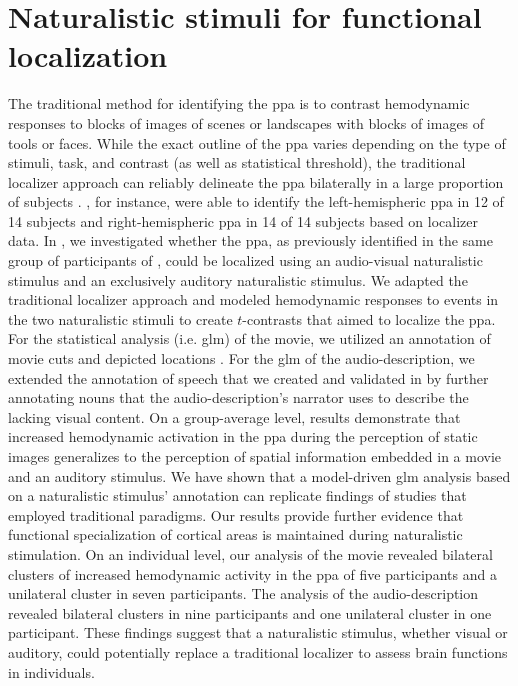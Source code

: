 \pagebreak


\section{Naturalistic stimuli for functional localization}

%
The traditional method for identifying the \ac{ppa} is to contrast hemodynamic
responses to blocks of images of scenes or landscapes with blocks of images of
tools or faces.
%
While the exact outline of the \ac{ppa} varies depending on the type of stimuli,
task, and contrast (as well as statistical threshold), the traditional localizer
approach can reliably delineate the \ac{ppa} bilaterally in a large proportion
of subjects \citep{zhen2017quantifying}.
%
\citet{sengupta2016extension}, for instance, were able to identify the
left-hemispheric \ac{ppa} in 12 of 14 subjects and right-hemispheric \ac{ppa} in
14 of 14 subjects based on localizer data.
In \citet{haeusler2022processing}, we investigated whether the \ac{ppa}, as
previously identified in the same group of participants of
\citet{sengupta2016extension}, could be localized using an audio-visual
naturalistic stimulus and an exclusively auditory naturalistic stimulus.
We adapted the traditional localizer approach and modeled hemodynamic responses
to events in the two naturalistic stimuli to create $t$-contrasts that aimed to
localize the \ac{ppa}.
For the statistical analysis (i.e. \ac{glm}) of the movie, we utilized an
annotation of movie cuts and depicted locations \citep{haeusler2016cutanno}.
For the \ac{glm} of the audio-description, we extended the annotation of speech
that we created and validated in \citet{haeusler2021speechanno} by further
annotating nouns that the audio-description's narrator uses to describe the
lacking visual content.
On a group-average level, results demonstrate that increased hemodynamic
activation in the \ac{ppa} during the perception of static images generalizes to
the perception of spatial information embedded in a movie and an auditory
stimulus.
%
We have shown that a model-driven \ac{glm} analysis based on a naturalistic
stimulus' annotation can replicate findings of studies that employed traditional
paradigms.
%
Our results provide further evidence \citep[cf.][]{bartels2004mapping} that
functional specialization of cortical areas is maintained during naturalistic
stimulation.
On an individual level, our analysis of the movie revealed bilateral clusters of
increased hemodynamic activity in the \ac{ppa} of five participants and a
unilateral cluster in seven participants.
%
The analysis of the audio-description revealed bilateral clusters in nine
participants and one unilateral cluster in one participant.
These findings suggest that a naturalistic stimulus, whether visual or auditory,
could potentially replace a traditional localizer to assess brain functions in
individuals.


